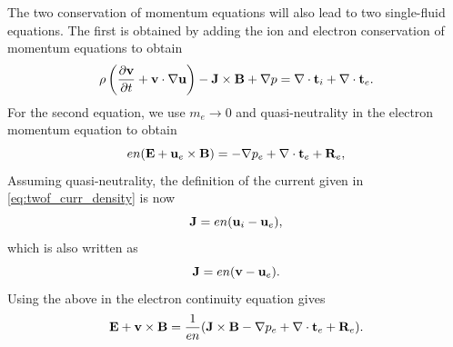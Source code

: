 \documentclass[a4paper,11pt]{report}
\begin{document}
The two conservation of momentum equations will also lead to two single-fluid equations. The first is obtained by adding the ion and electron conservation of momentum equations to obtain
\begin{equation}
\label{eq:generalized_MHD_vel}
    \rho \left (\frac{\partial \mathbf{v}}{\partial t} + \mathbf{v} \cdot \nabla \mathbf{u} \right) - \mathbf{J} \times \mathbf{B} + \nabla p = \nabla \cdot \mathbf{t}_i + \nabla \cdot \mathbf{t}_e.
\end{equation}
For the second equation, we use $m_e \to 0$ and quasi-neutrality in the electron momentum equation to obtain
\begin{equation}
    e n ( \mathbf{E} + \mathbf{u}_e \times \mathbf{B} ) = - \nabla p_e + \nabla \cdot \mathbf{t}_e + \mathbf{R}_e,
\end{equation}
Assuming quasi-neutrality, the definition of the current given in \cref{eq:twof_curr_density} is now
\begin{equation}
\label{eq:current_def_quasineutral}
    \mathbf{J} = e n (\mathbf{u}_i - \mathbf{u}_e),
\end{equation}
which is also written as
\begin{equation}
    \mathbf{J} = e n (\mathbf{v} - \mathbf{u}_e).
\end{equation}
Using the above in the electron continuity equation gives
\begin{equation}
\label{eq:generalized_MHD_ohms}
    \mathbf{E} + \mathbf{v} \times \mathbf{B} = \frac{1}{en} ( \mathbf{J} \times \mathbf{B} - \nabla p_e + \nabla \cdot \mathbf{t}_e + \mathbf{R}_e).
\end{equation}
\end{document}
